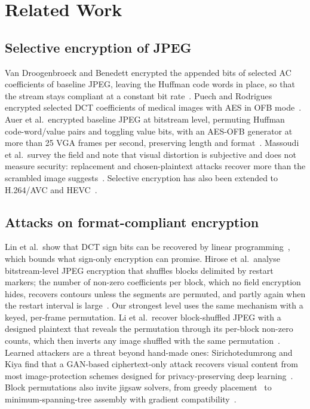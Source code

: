 \section{Related Work}\label{sec:related}
\subsection{Selective encryption of JPEG}
Van Droogenbroeck and Benedett encrypted the appended bits of selected AC coefficients of baseline JPEG, leaving the Huffman code words in place, so that the stream stays compliant at a constant bit rate~\cite{vandroogenbroeck2002}. Puech and Rodrigues encrypted selected DCT coefficients of medical images with AES in OFB mode~\cite{puech2005}. Auer et al.\ encrypted baseline JPEG at bitstream level, permuting Huffman code-word/value pairs and toggling value bits, with an AES-OFB generator at more than 25 VGA frames per second, preserving length and format~\cite{auer2013}. Massoudi et al.\ survey the field and note that visual distortion is subjective and does not measure security: replacement and chosen-plaintext attacks recover more than the scrambled image suggests~\cite{massoudi2008}. Selective encryption has also been extended to H.264/AVC and HEVC~\cite{boyadjis2017}.

\subsection{Attacks on format-compliant encryption}
Lin et al.\ show that DCT sign bits can be recovered by linear programming~\cite{lin2024}, which bounds what sign-only encryption can promise. Hirose et al.\ analyse bitstream-level JPEG encryption that shuffles blocks delimited by restart markers; the number of non-zero coefficients per block, which no field encryption hides, recovers contours unless the segments are permuted, and partly again when the restart interval is large~\cite{hirose2024}. Our strongest level uses the same mechanism with a keyed, per-frame permutation. Li et al.\ recover block-shuffled JPEG with a designed plaintext that reveals the permutation through its per-block non-zero counts, which then inverts any image shuffled with the same permutation~\cite{li2025shuffle}. Learned attackers are a threat beyond hand-made ones: Sirichotedumrong and Kiya find that a GAN-based ciphertext-only attack recovers visual content from most image-protection schemes designed for privacy-preserving deep learning~\cite{sirichotedumrong2020}. Block permutations also invite jigsaw solvers, from greedy placement~\cite{pomeranz2011} to minimum-spanning-tree assembly with gradient compatibility~\cite{gallagher2012}.

